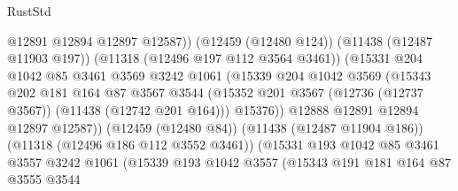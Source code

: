 \begin{lexlean}{RustStd}
\begin{coremodule}
                                    @12891
                                    @12894
                                    @12897
                                    @12587))
                                (@12459 (@12480 @124))
                                (@11438 (@12487 @11903 @197))
                                (@11318 (@12496 @197 @112 @3564 @3461))
                                (@15331
                                  @204
                                  @1042
                                  @85
                                  @3461
                                  @3569
                                  @3242
                                  @1061
                                  (@15339
                                    @204
                                    @1042
                                    @3569
                                    (@15343
                                      @202
                                      @181
                                      @164
                                      @87
                                      @3567
                                      @3544
                                      (@15352
                                        @201
                                        @3567
                                        (@12736 (@12737 @3567))
                                        (@11438 (@12742 @201 @164)))
                                      @15376))
                                  @12888
                                  @12891
                                  @12894
                                  @12897
                                  @12587))
                              (@12459 (@12480 @84))
                              (@11438 (@12487 @11904 @186))
                              (@11318 (@12496 @186 @112 @3552 @3461))
                              (@15331
                                @193
                                @1042
                                @85
                                @3461
                                @3557
                                @3242
                                @1061
                                (@15339
                                  @193
                                  @1042
                                  @3557
                                  (@15343
                                    @191
                                    @181
                                    @164
                                    @87
                                    @3555
                                    @3544

\end{coremodule}
\end{lexlean}
